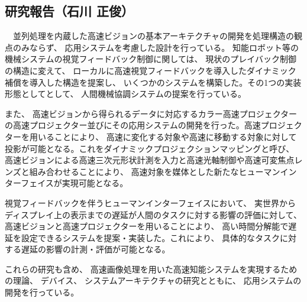 \subsection{研究報告（石川 正俊）}

　並列処理を内蔵した高速ビジョンの基本アーキテクチャの開発を処理構造の観点のみならず、 応用システムを考慮した設計を行っている。
知能ロボット等の機械システムの視覚フィードバック制御に関しては、 現状のプレイバック制御の構造に変えて、 ローカルに高速視覚フィードバックを導入したダイナミック補償を導入した構造を提案し、 いくつかのシステムを構築した。その1つの実装形態としてとして、 人間機械協調システムの提案を行っている。

また、 高速ビジョンから得られるデータに対応するカラー高速プロジェクターの高速プロジェクター並びにその応用システムの開発を行った。高速プロジェクターを用いることにより、 高速に変化する対象や高速に移動する対象に対して投影が可能となる。これをダイナミックプロジェクションマッピングと呼び、 高速ビジョンによる高速三次元形状計測を入力と高速光軸制御や高速可変焦点レンズと組み合わせることにより、 高速対象を媒体とした新たなヒューマンインターフェイスが実現可能となる。

視覚フィードバックを伴うヒューマンインターフェイスにおいて、 実世界からディスプレイ上の表示までの遅延が人間のタスクに対する影響の評価に対して、 高速ビジョンと高速プロジェクターを用いることにより、 高い時間分解能で遅延を設定できるシステムを提案・実装した。これにより、 具体的なタスクに対する遅延の影響の計測・評価が可能となる。

これらの研究も含め、 高速画像処理を用いた高速知能システムを実現するための理論、 デバイス、 システムアーキテクチャの研究とともに、 応用システムの開発を行っている。
